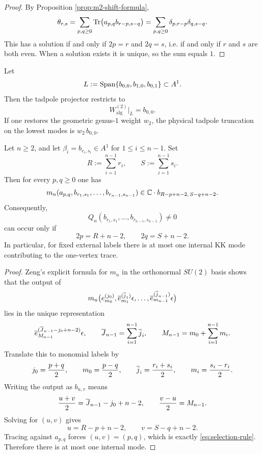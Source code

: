 \begin{proof}
By Proposition \ref{prop:m2-shift-formula},
\[
\theta_{r,s}
=
\sum_{p,q\ge 0}\operatorname{Tr}\bigl(a_{p,q} b_{r-p,s-q}\bigr)
=
\sum_{p,q\ge 0}\delta_{p,r-p}\delta_{q,s-q}.
\]
This has a solution if and only if $2p=r$ and $2q=s$, i.e. if and only if $r$ and $s$ are both
even. When a solution exists it is unique, so the sum equals $1$.
\end{proof}

\begin{corollary}
Let
\[
L:=\operatorname{Span}\{b_{0,0},b_{1,0},b_{0,1}\}\subset A^1.
\]
Then the tadpole projector restricts to
\[
W^{(2)}_{\mathrm{alg}}\big|_L=b_{0,0}.
\]
If one restores the geometric genus-$1$ weight $w_2$, the physical tadpole truncation on the
lowest modes is $w_2\,b_{0,0}$.
\end{corollary}

\begin{theorem}
Let $n\ge 2$, and let $\beta_i=b_{r_i,s_i}\in A^1$ for $1\le i\le n-1$. Set
\[
R:=\sum_{i=1}^{n-1} r_i,
\qquad
S:=\sum_{i=1}^{n-1} s_i.
\]
Then for every $p,q\ge 0$ one has
\[
m_n(a_{p,q},b_{r_1,s_1},\dots,b_{r_{n-1},s_{n-1}})
\in
\mathbb C\cdot b_{R-p+n-2,\,S-q+n-2}.
\]
Consequently,
\[
Q_n(b_{r_1,s_1},\dots,b_{r_{n-1},s_{n-1}})\neq 0
\]
can occur only if
\begin{equation}
2p=R+n-2,
\qquad
2q=S+n-2.
\end{equation}
In particular, for fixed external labels there is at most one internal KK mode contributing to
the one-vertex trace.
\end{theorem}

\begin{proof}
Zeng's explicit formula for $m_n$ in the orthonormal $SU(2)$ basis shows that the output of
\[
m_n\bigl(e_{m_0}^{(j_0)},\overline{e}_{m_1}^{(\overline{j}_1)}\epsilon,\dots,
\overline{e}_{m_{n-1}}^{(\overline{j}_{n-1})}\epsilon\bigr)
\]
lies in the unique representation
\[
\overline{e}_{M_{n-1}}^{(\overline{J}_{n-1}-j_0+n-2)}\epsilon,
\qquad
\overline{J}_{n-1}=\sum_{i=1}^{n-1}\overline{j}_i,
\qquad
M_{n-1}=m_0+\sum_{i=1}^{n-1}m_i.
\]
Translate this to monomial labels by
\[
j_0=\frac{p+q}{2},\qquad m_0=\frac{p-q}{2},
\qquad
\overline{j}_i=\frac{r_i+s_i}{2},\qquad m_i=\frac{s_i-r_i}{2}.
\]
Writing the output as $b_{u,v}$ means
\[
\frac{u+v}{2}=\overline{J}_{n-1}-j_0+n-2,
\qquad
\frac{v-u}{2}=M_{n-1}.
\]
Solving for $(u,v)$ gives
\[
u=R-p+n-2,
\qquad
v=S-q+n-2.
\]
Tracing against $a_{p,q}$ forces $(u,v)=(p,q)$, which is exactly
\eqref{eq:selection-rule}. Therefore there is at most one internal mode.
\end{proof}

